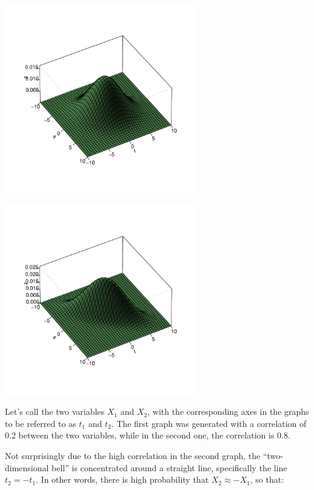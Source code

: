 \begin{minipage}[b]{0.65\linewidth}
    \mbox{\includegraphics[width=3.25in]{Images/Rho2.pdf}} 
\end{minipage}
\hspace{0.0in}
\begin{minipage}[b]{0.65\linewidth}
    \mbox{\includegraphics[width=3.25in]{Images/Rho8.pdf}} 
\end{minipage}

Let's call the two variables $X_1$ and $X_2$, with the corresponding
axes in the graphs to be referred to as $t_1$ and $t_2$.  The first
graph was generated with a correlation of 0.2 between the two variables,
while in the second one, the correlation is 0.8.

Not surprisingly due to the high correlation in the second graph, the
``two-dimensional bell'' is concentrated around a straight line,
specifically the line $t_2 = - t_1$.  In other words, there is high
probability that $X_2 \approx -X_1$, so that:  

